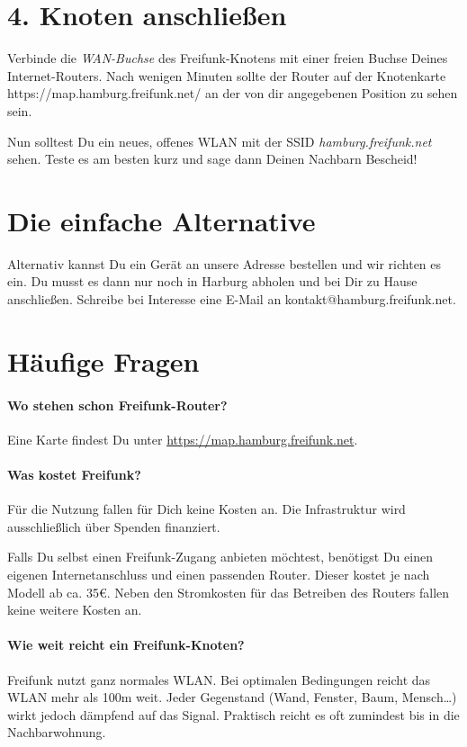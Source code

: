 \documentclass[10pt,a4paper,notumble]{leaflet}
\begin{document}
\section{4. Knoten anschließen}
Verbinde die \textit{WAN-Buchse} des Freifunk-Knotens mit einer freien Buchse Deines Internet-Routers. Nach wenigen Minuten sollte der Router auf der Knotenkarte \mbox{https://map.hamburg.freifunk.net/} an der von dir angegebenen Position zu sehen sein.

Nun solltest Du ein neues, offenes WLAN mit der SSID \mbox{\textit{hamburg.freifunk.net}} sehen. Teste es am besten kurz und sage dann Deinen Nachbarn Bescheid!

\section{Die einfache Alternative}
Alternativ kannst Du ein Gerät an unsere Adresse bestellen und wir richten es ein. Du musst es dann nur noch in Harburg abholen und bei Dir zu Hause anschließen. Schreibe bei Interesse eine \mbox{E-Mail} an \mbox{kontakt@hamburg.freifunk.net}.

\newpage
\section{Häufige Fragen}
\setlength{\parskip}{0.1em}
\paragraph{Wo stehen schon Freifunk-Router?} Eine Karte findest Du unter \mbox{\href{https://map.hamburg.freifunk.net}{https://map.hamburg.freifunk.net}}.

\paragraph{Was kostet Freifunk?}
Für die Nutzung fallen für Dich keine Kosten an. Die Infrastruktur wird ausschließlich über Spenden finanziert.

Falls Du selbst einen Freifunk-Zugang anbieten möchtest, benötigst Du einen eigenen Internetanschluss und einen passenden Router. Dieser kostet je nach Modell ab ca. 35€.  Neben den Stromkosten für das Betreiben des Routers fallen keine weitere Kosten an.

\paragraph{Wie weit reicht ein Freifunk-Knoten?} Freifunk nutzt ganz normales WLAN. Bei optimalen Bedingungen reicht das WLAN mehr als 100m weit. Jeder Gegenstand (Wand, Fenster, Baum, Mensch…) wirkt jedoch dämpfend auf das Signal. Praktisch reicht es oft zumindest bis in die Nachbarwohnung.
\end{document}
